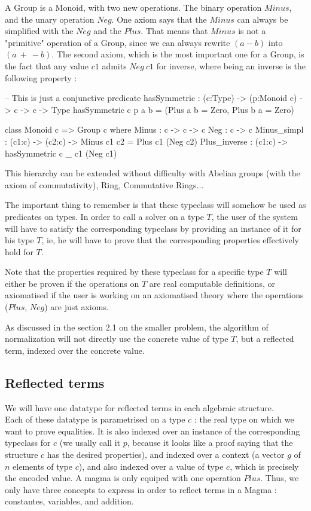 \documentclass{sigplanconf}
\begin{document}
A Group is a Monoid, with two new operations. The binary operation $Minus$, and the unary operation $Neg$. One axiom says that the $Minus$ can always be simplified with the $Neg$ and the $Plus$. That means that $Minus$ is not a "primitive" operation of a Group, since we can always rewrite $(a-b)$ into $(a\ +\ -b)$.
The second axiom, which is the most important one for a Group, is the fact that any value $c1$ admits $Neg\ c1$ for inverse, where being an inverse is the following property :

\begin{code}[caption=Group, captionpos=b, label=lst1:haskell2]   
-- This is just a conjunctive predicate
hasSymmetric : (c:Type) -> (p:Monoid c) 
                -> c -> c -> Type
hasSymmetric c p a b = 
         (Plus a b = Zero, Plus b a = Zero)    
  
class Monoid c => Group c where
	Minus : c -> c -> c
	Neg : c -> c
	Minus_simpl : (c1:c) -> (c2:c) -> 
	             Minus c1 c2 = Plus c1 (Neg c2) 
	Plus_inverse : (c1:c) -> 
	             hasSymmetric c _ c1 (Neg c1)
\end{code}	

This hierarchy can be extended without difficulty with Abelian groups (with the axiom of commutativity), Ring, Commutative Rings...

The important thing to remember is that these typeclass will somehow be used as predicates on types. In order to call a solver on a type $T$, the user of the system will have to satisfy the corresponding typeclass by providing an instance of it for his type $T$, ie, he will have to prove that the corresponding properties effectively hold for $T$.

Note that the properties required by these typeclass for a specific type $T$ will either be proven if the operations on $T$ are real computable definitions, or axiomatised if the user is working on an axiomatised theory where the operations ($Plus$, $Neg$) are just axioms.

As discussed in the section 2.1 on the smaller problem, the algorithm of normalization will not directly use the concrete value of type $T$, but a reflected term, indexed over the concrete value.


	\subsection {Reflected terms}

We will have one datatype for reflected terms in each algebraic structure. \\
Each of these datatype is parametrised on a type $c$ : the real type on which we want to prove equalities. It is also indexed over an instance of the corresponding typeclass for $c$ (we usally call it $p$, because it looks like a proof saying that the structure $c$ has the desired properties), and indexed over a context (a vector $g$ of $n$ elements of type $c$), and also indexed over a value of type $c$, which is precisely the encoded value.
A magma is only equiped with one operation $Plus$. Thus, we only have three concepts to express in order to reflect terms in a Magma : constantes, variables, and addition.
\end{document}
